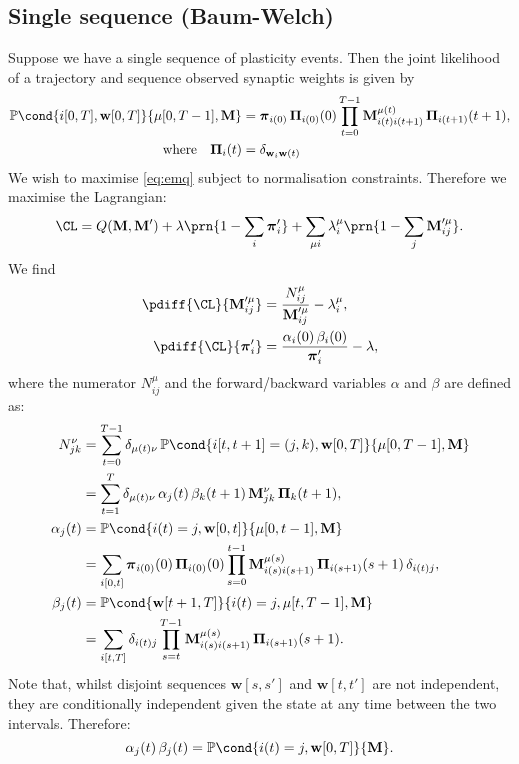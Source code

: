 \documentclass[12pt]{article}
\newcommand{\pib}{\boldsymbol{\pi}}
\newcommand{\Pib}{\boldsymbol{\Pi}}
\newcommand{\w}{\mathbf{w}}
\newcommand{\M}{\mathbf{M}}
\newcommand{\pr}{\mathbb{P}}
\begin{document}
\subsection{Single sequence (Baum-Welch) \label{sec:bw}}

Suppose we have a single sequence of plasticity events.
Then the joint likelihood of a trajectory and sequence observed synaptic weights is given by
%
\begin{equation}\label{eq:trajlike}
\begin{aligned}
  \pr\cond{i[0,T], \w[0,T]}{\mu[0,T-1],\M} &= \pib_{i(0)} \, \Pib_{i(0)}(0) 
        \prod_{t=0}^{T-1} \M^{\mu(t)}_{i(t)i(t+1)} \, \Pib_{i(t+1)}(t+1),\\
  \text{where}\quad
  \Pib_i(t) &= \delta_{\w_{i}\w(t)}
\end{aligned}
\end{equation}
%
We wish to maximise \eqref{eq:emq} subject to normalisation constraints.
Therefore we maximise the Lagrangian:
%
\begin{equation}\label{eq:lagrangesingle}
  \CL = Q(\M,\M') + \lambda\prn{1-\sum_i\pib'_i} + \sum_{\mu i} \lambda^\mu_i\prn{1-\sum_j\M'^\mu_{ij}}. 
\end{equation}
%
We find
%
\begin{equation}\label{eq:singlediffs}
\begin{aligned}
  \pdiff{\CL}{\M'^\mu_{ij}} &= \frac{N^\mu_{ij}}{\M'^\mu_{ij}} - \lambda^\mu_{i}, \\
  \pdiff{\CL}{\pib'_{i}} &= \frac{\alpha_i(0) \, \beta_i(0)}{\pib'_{i}} - \lambda,
\end{aligned}
\end{equation}
%
where the numerator $N^\mu_{ij}$ and the forward/backward variables $\alpha$ and $\beta$ are defined as:
%
\begin{equation}\label{eq:alphabeta}
\begin{aligned}
  N^\nu_{jk} &= \sum_{t=0}^{T-1} \delta_{\mu(t)\nu} \, 
        \pr\cond{i[t,t+1]=(j,k),\w[0,T]}{\mu[0,T-1],\M} \\
     &= \sum_{t=1}^{T} \delta_{\mu(t)\nu} \, 
        \alpha_j(t) \, \beta_k(t+1) \, \M^{\nu}_{jk} \, \Pib_k(t+1) ,\\
  \alpha_j(t) &= \pr\cond{i(t)=j,\w[0,t]}{\mu[0,t-1],\M} \\
     &= \sum_{i[0,t]} \pib_{i(0)}(0) \, \Pib_{i(0)}(0) \prod_{s=0}^{t-1} \M^{\mu(s)}_{i(s)i(s+1)} \, \Pib_{i(s+1)}(s+1) \,\delta_{i(t)j}, \\
  \beta_j(t) &= \pr\cond{\w[t+1,T]}{i(t)=j,\mu[t,T-1],\M} \\
     &= \sum_{i[t,T]} \delta_{i(t)j} \prod_{s=t}^{T-1} \M^{\mu(s)}_{i(s)i(s+1)} \, \Pib_{i(s+1)}(s+1).
\end{aligned}
\end{equation}
%
Note that, whilst disjoint sequences $\w[s,s']$ and $\w[t,t']$ are not independent, they are conditionally independent given the state at any time between the two intervals.
Therefore:
%
\begin{equation}\label{eq:stateprob}
  \alpha_j(t) \, \beta_j(t) = \pr\cond{i(t)=j,\w[0,T]}{\M}.
\end{equation}
%
\end{document}
